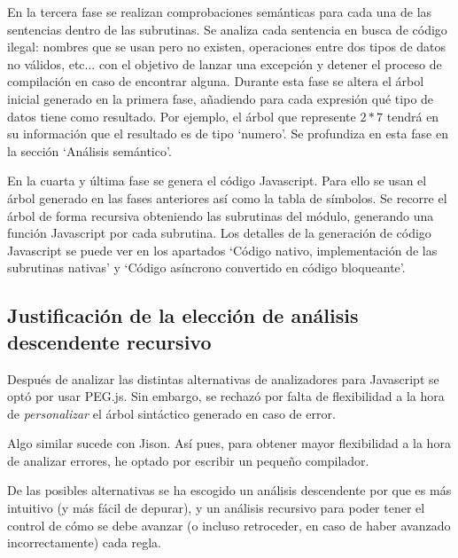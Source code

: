 \documentclass{report}
\begin{document}
	\vspace{10px}
	
	En la tercera fase se realizan comprobaciones semánticas para cada una de las sentencias dentro de las subrutinas. Se analiza cada sentencia en busca de código ilegal: nombres que se usan pero no existen, operaciones entre dos tipos de datos no válidos, etc... con el objetivo de lanzar una excepción y detener el proceso de compilación en caso de encontrar alguna. Durante esta fase se altera el árbol inicial generado en la primera fase, añadiendo para cada expresión qué tipo de datos tiene como resultado. Por ejemplo, el árbol que represente $2 * 7$ tendrá en su información que el resultado es de tipo `numero'.  Se profundiza en esta fase en la sección `Análisis semántico'.
	
	\vspace{10px}
	
	En la cuarta y última fase se genera el código Javascript. Para ello se usan el árbol generado en las fases anteriores así como la tabla de símbolos. Se recorre el árbol de forma recursiva obteniendo las subrutinas del módulo, generando una función Javascript por cada subrutina. Los detalles de la generación de código Javascript se puede ver en los apartados `Código nativo, implementación de las subrutinas nativas' y `Código asíncrono convertido en código bloqueante'.
	
	\subsection{Justificación de la elección de análisis descendente recursivo}
	
	Después de analizar las distintas alternativas de analizadores para Javascript se optó por usar PEG.js. Sin embargo, se rechazó por falta de flexibilidad a la hora de \textit{personalizar} el árbol sintáctico generado en caso de error. 
	
	\vspace{10px}
	
	Algo similar sucede con Jison. Así pues, para obtener mayor flexibilidad a la hora de analizar errores, he optado por escribir un pequeño compilador. 
	
	\vspace{10px}
	
	De las posibles alternativas se ha escogido un análisis descendente por que es más intuitivo (y más fácil de depurar), y un análisis recursivo para poder tener el control de cómo se debe avanzar (o incluso retroceder, en caso de haber avanzado incorrectamente) cada regla. 
	
\end{document}
